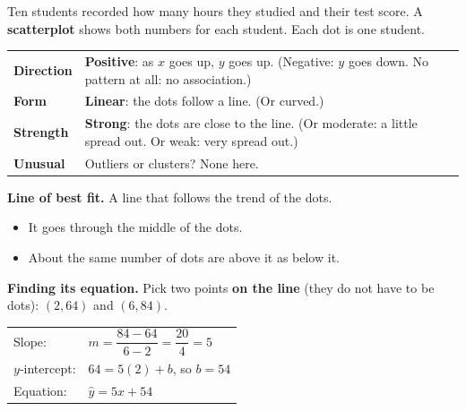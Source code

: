 \documentclass[11pt]{article}
\begin{document}

Ten students recorded how many hours they studied and their test score. A \textbf{scatterplot} shows both numbers for each student. Each dot is one student.

\vspace{0.3em}
\begin{minipage}[c]{0.5\linewidth}\centering
{}
\end{minipage}\hfill
\begin{minipage}[c]{0.47\linewidth}
\renewcommand{\arraystretch}{1.25}
\begin{tabular}{@{}p{0.85in}>{\raggedright\arraybackslash}p{2.18in}}
\textbf{Direction} & \textbf{Positive}: as $x$ goes up, $y$ goes up. (Negative: $y$ goes down. No pattern at all: no association.)\\
\textbf{Form} & \textbf{Linear}: the dots follow a line. (Or curved.)\\
\textbf{Strength} & \textbf{Strong}: the dots are close to the line. (Or moderate: a little spread out. Or weak: very spread out.)\\
\textbf{Unusual} & Outliers or clusters? None here.\\
\end{tabular}
\end{minipage}

\vspace{0.8em}
\textbf{Line of best fit.} A line that follows the trend of the dots.
\begin{itemize}[itemsep=0pt,topsep=2pt]
  \item It goes through the middle of the dots.
  \item About the same number of dots are above it as below it.
\end{itemize}

\vspace{0.6em}
\textbf{Finding its equation.} Pick two points \textbf{on the line} (they do not have to be dots): $(2, 64)$ and $(6, 84)$.

\vspace{0.3em}
\renewcommand{\arraystretch}{1.6}
\begin{tabular}{@{}ll}
Slope: & $m = \dfrac{84 - 64}{6 - 2} = \dfrac{20}{4} = 5$\\
$y$-intercept: & $64 = 5(2) + b$, \; so $b = 54$\\
Equation: & $\hat{y} = 5x + 54$\\
\end{tabular}
\end{document}
